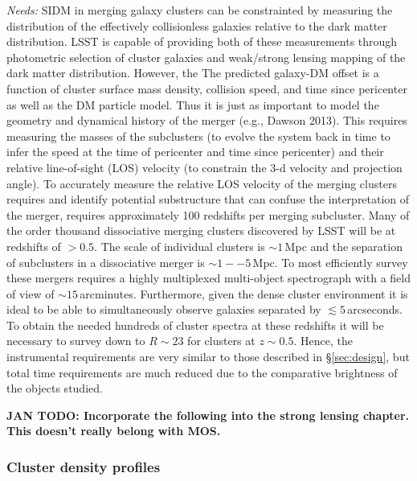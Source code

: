 {\it Needs:} SIDM in merging galaxy clusters can be constrainted by measuring
the distribution of the effectively collisionless galaxies relative to the dark
matter distribution. LSST is capable of providing both of these measurements
through photometric selection of cluster galaxies and weak/strong lensing
mapping of the dark matter distribution. However, the The predicted galaxy-DM
offset is a function of cluster surface mass density, collision speed, and time
since pericenter as well as the DM particle model. Thus it is just as important
to model the geometry and dynamical history of the merger (e.g., Dawson 2013).
This requires measuring the masses of the subclusters (to evolve the system back
in time to infer the speed at the time of pericenter and time since pericenter)
and their relative line-of-sight (LOS) velocity (to constrain the 3-d velocity
and projection angle). To accurately measure the relative LOS velocity of the
merging clusters requires and identify potential substructure that can confuse
the interpretation of the merger, requires approximately 100 redshifts per
merging subcluster. Many of the order thousand dissociative merging clusters
discovered by LSST will be at redshifts of $>0.5$. The scale of individual
clusters is $\sim 1$\,Mpc and the separation of subclusters in a dissociative
merger is $\sim 1--5$\,Mpc. To most efficiently survey these mergers requires a
highly multiplexed multi-object spectrograph with a field of view of $\sim
15$\,arcminutes. Furthermore, given the dense cluster environment it is ideal to
be able to simultaneously observe galaxies separated by $\lesssim
5$\,arcseconds. To obtain the needed hundreds of cluster spectra at these
redshifts it will be necessary to survey down to $R\sim23$ for clusters at $z\sim 0.5$.  Hence, the instrumental requirements are very similar to those described in \S \ref{sec:design}, but total time requirements are much reduced due to the comparative brightness of the objects studied.


{\bf  JAN TODO: Incorporate the following into the strong lensing chapter.  This doesn't really belong with MOS.}
\subsubsection{Cluster density profiles}

